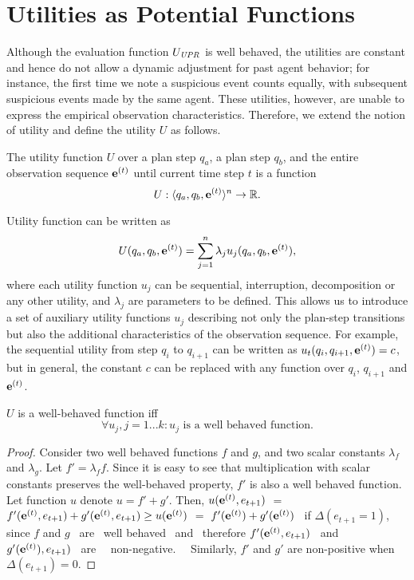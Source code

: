 \section{Utilities as Potential Functions}
\noindent
Although the evaluation function $U_{\mathit{UPR}}$ is well behaved, the utilities are constant and hence do not allow a dynamic adjustment for past agent behavior; for instance, the first time we note a suspicious event counts equally, with subsequent suspicious events made by the same agent. 
These utilities, however, are unable to express the empirical observation characteristics. Therefore, we extend the notion of utility and define the utility $U$ as follows.
\begin{definition}
The utility function $U$ over a plan step $q_a$, a plan step $q_{b}$, and the entire observation sequence $\mathbf{e}^{\scriptsize(t)}$ until current time step $t$ is a function
$$
U: \langle q_a, q_{b}, \mathbf{e}^{\scriptsize(t)} \rangle ^n \rightarrow \mathbb{R}. 
$$
\end{definition}
%
Utility function can be written as
$$
U(q_a, q_{b}, \mathbf{e}^{\scriptsize(t)}) = \sum_{j=1}^n \lambda_j u_j(q_a, q_{b}, \mathbf{e}^{\scriptsize(t)}),
$$
where each utility function $u_j$ can be sequential, interruption,  decomposition or any other utility, and $\lambda_j$ are parameters to be defined. 
%
This allows us to introduce a set of auxiliary utility functions $u_j$ describing not only the plan-step transitions but also the additional characteristics of the observation sequence. For example, the sequential utility from step $q_i$ to $q_{i+1}$ can be written as $u_t(q_i, q_{i+1}, \mathbf{e}^{\scriptsize(t)}) = c$, but in general, the constant $c$ can be replaced with any function over $q_i$, $q_{i+1}$ and $\mathbf{e}^{\scriptsize(t)}$.


\begin{theorem}
$U$ is a well-behaved function iff $$\forall u_j, j=1...k: u_j \text{ is a well behaved function.}$$
\end{theorem}
\begin{proof}
Consider two well behaved functions $f$ and $g$, and two scalar constants $\lambda_f$ and $\lambda_g$. Let  $f'=\lambda_f f$. Since it is easy to see that multiplication with scalar constants preserves the well-behaved property, $f'$ is also a well behaved function. Let function $u$ denote $u=f'+g'$. Then, $u(\mathbf{e}^{\scriptsize(t)}, e_{t+1})$ $=$ $f'(\mathbf{e}^{\scriptsize(t)}, e_{t+1})+g'(\mathbf{e}^{\scriptsize(t)}, e_{t+1}) \geq u(\mathbf{e}^{\scriptsize(t)})$ $=$  $f'(\mathbf{e}^{\scriptsize(t)})+g'(\mathbf{e}^{\scriptsize(t)})$ ~if $\Delta(e_{t+1}=1)$, since $f$ and $g$ ~are ~well behaved ~and ~therefore $f'(\mathbf{e}^{\scriptsize(t)}, e_{t+1})$ ~and ~$g'(\mathbf{e}^{\scriptsize(t)}), e_{t+1})$ ~are ~~non-negative. ~~Similarly, $f'$ and $g'$ are non-positive when $\Delta(e_{t+1})=0$.
\end{proof}





